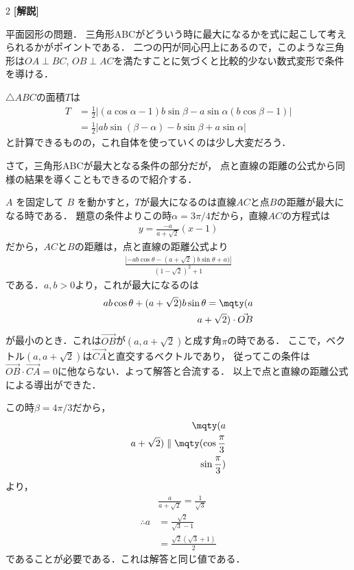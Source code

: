 \documentclass[../../main.tex]{subfiles}
\begin{document}
\begin{multicols}{2}
  \vspace{10pt}
  {\bf[解説]}

  平面図形の問題．
  三角形ABCがどういう時に最大になるかを式に起こして考えられるかがポイントである．
  二つの円が同心円上にあるので，このような三角形は$OA \perp BC$, $OB \perp AC$を満たすことに気づくと比較的少ない数式変形で条件を導ける．

  $\triangle ABC$の面積$T$は
  \begin{align*}
    T
     & = \frac{1}{2} \left| (a\cos\alpha-1)b\sin\beta - a\sin\alpha(b\cos\beta-1) \right| \\
     & = \frac{1}{2} \left| ab\sin(\beta-\alpha) - b\sin\beta + a\sin\alpha \right|
  \end{align*}
  と計算できるものの，これ自体を使っていくのは少し大変だろう．

  さて，三角形ABCが最大となる条件の部分だが，
  点と直線の距離の公式から同様の結果を導くこともできるので紹介する．

  $A$ を固定して $B$ を動かすと，$T$が最大になるのは直線$AC$と点$B$の距離が最大になる時である．
  題意の条件よりこの時$\alpha=3\pi/4$だから，直線$AC$の方程式は
  \begin{align*}
    y = \frac{-a}{a+\sqrt{2}}(x-1)
  \end{align*}
  だから，$AC$と$B$の距離は，点と直線の距離公式より
  \begin{align*}
    \frac{\left| -ab\cos\theta - (a+\sqrt{2})b\sin\theta +a)\right|}{(1-\sqrt{2})^2+1}
  \end{align*}
  である．$a,b>0$より，これが最大になるのは
  \begin{align*}
    ab\cos\theta + (a+\sqrt{2})b\sin\theta = \mqty(a \\ a+\sqrt{2}) \cdot \vec{OB}
  \end{align*}
  が最小のとき．これは$\vec{OB}$が$(a,a+\sqrt{2})$と成す角$\pi$の時である．
  ここで，ベクトル$(a,a+\sqrt{2})$は$\vec{CA}$と直交するベクトルであり，
  従ってこの条件は$\vec{OB}\cdot\vec{CA}=0$に他ならない．よって解答と合流する．
  以上で点と直線の距離公式による導出ができた．

  この時$\beta=4\pi/3$だから，
  \begin{align*}
    \mqty(a \\ a+\sqrt{2}) \parallel \mqty(\cos\frac{\pi}{3} \\ \sin\frac{\pi}{3})
  \end{align*}
  より，
  \begin{align*}
      & \frac{a}{a+\sqrt{2}} = \frac{1}{\sqrt{3}} \\
    \therefore
    a & = \frac{\sqrt{2}}{\sqrt{3}-1}             \\
      & = \frac{\sqrt{2}(\sqrt{3}+1)}{2}
  \end{align*}
  であることが必要である．これは解答と同じ値である．

  \newpage
\end{multicols}
\end{document}
